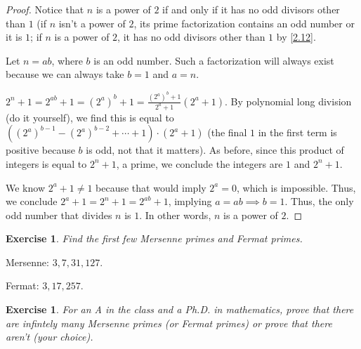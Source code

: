 \documentclass{article}
\newtheorem{ex}[thm]{Exercise}
\numberwithin{equation}{thm}
\begin{document}
\begin{proof}
  Notice that $n$ is a power of $2$ if and only if it has no odd divisors other than $1$ (if $n$ isn't a power of $2$, its prime factorization contains an odd number or it is $1$; if $n$ is a power of $2$, it has no odd divisors other than $1$ by \ref{2.12}.

  Let $n = ab$, where $b$ is an odd number. Such a factorization will always exist because we can always take $b = 1$ and $a = n$.

  $2^n + 1 = 2^{ab} + 1 = (2^a)^b + 1 = \frac{(2^a)^b + 1}{2^a + 1} (2^a + 1)$. By polynomial long division (do it yourself), we find this is equal to $((2^a)^{b-1} - (2^a)^{b-2} + \cdots + 1) \cdot (2^a + 1)$ (the final $1$ in the first term is positive because $b$ is odd, not that it matters). As before, since this product of integers is equal to $2^n + 1$, a prime, we conclude the integers are $1$ and $2^n + 1$.

  We know $2^a + 1 \neq 1$ because that would imply $2^a = 0$, which is impossible. Thus, we conclude $2^a + 1 = 2^n + 1 = 2^{ab} + 1$, implying $a = ab \implies b = 1$. Thus, the only odd number that divides $n$ is $1$. In other words, $n$ is a power of $2$.
\end{proof}



\begin{ex} \label{2.44}
  Find the first few Mersenne primes and Fermat primes.
\end{ex}

Mersenne: $3, 7, 31, 127$.

Fermat: $3, 17, 257$.



\begin{ex} \label{2.45}
  For an A in the class and a Ph.D. in mathematics, prove that there are infintely many Mersenne primes (or Fermat primes) or prove that there aren't (your choice).
\end{ex}
\end{document}
